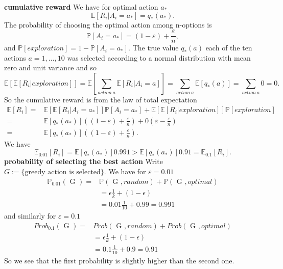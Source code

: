 \documentclass[answers]{exam}
\theoremstyle{definition}
\theoremstyle{remark}
\newcommand{\Prob}{\mathbb{P}}
\newcommand{\Proba}[1]{\mathbb{P}\left[#1\right]}
\newcommand{\Exp}{\mathbb{E}}
\newcommand{\Expe}[1]{\mathbb{E}\left[ #1\right] }
\newcommand{\e}{\varepsilon}
\begin{document}
\begin{solution}\textbf{ cumulative reward} We have for optimal action $a_{*}$
\begin{equation}
\Expe{R_{i}|A_{i}=a_{*}}=q_{*}(a_{*}).    
\end{equation}
The probability of choosing the optimal action among n-options is
\begin{equation}
\Proba{A_{i}=a_{*}}=(1-\e)+\frac{\e}{n},
\end{equation}
and $\Proba{exploration}=1- \Proba{A_{i}=a_{*}}$. The true value $q_{*}(a)$ each of the ten actions $a=1,...,10$ was selected according to a normal distribution with mean zero and unit variance and so
\begin{equation}
\Expe{\Expe{R_{i}|exploration}}=\Expe{\sum_{action~a}\Expe{R_{i}|A_{i}=a}} =\sum_{action~a}\Expe{q_{*}(a)}=\sum_{action~a}0=0.   
\end{equation}
So the cumulative reward is from the law of total expectation
\begin{align*}
\Expe{R_{i}}=&\Expe{\Expe{R_{i}|A_{i}=a_{*}}}\Proba{A_{i}=a_{*}}+\Expe{\Expe{R_{i}|exploration}}\Proba{exploration}\\    
=&\Expe{q_{*}(a_{*})}((1-\e)+\frac{\e}{n})+0(\e-\frac{\e}{n})\\   
=&\Expe{q_{*}(a_{*})}((1-\e)+\frac{\e}{n}).
\end{align*}
We have
\begin{equation}
\Exp_{0.01}[R_{i}]=\Expe{q_{*}(a_{*})}0.991>\Expe{q_{*}(a_{*})}0.91=\Exp_{0.1}[R_{i}].   
\end{equation}
\textbf{probability of selecting the best action}
Write $G:=\{\text{greedy action is selected}\}$. We have for $\e=0.01$
\begin{align*}
\Prob_{0.01}(\text{ G })=&\Prob(\text{ G },random)+\Prob(\text{ G },optimal)    \\
&=\epsilon\frac{1}{k}+(1-\epsilon)\\
&=0.01\frac{1}{10}+0.99=0.991
\end{align*}  
and similarly for $\e=0.1$
\begin{align*}
Prob_{0.1}(\text{ G })=&Prob(\text{ G },random)+Prob(\text{ G },optimal)    \\
&=\epsilon\frac{1}{k}+(1-\epsilon)\\
&=0.1\frac{1}{10}+0.9=0.91
\end{align*}  
So we see that the first probability is slightly higher than the second one.



\end{solution}
\end{document}
